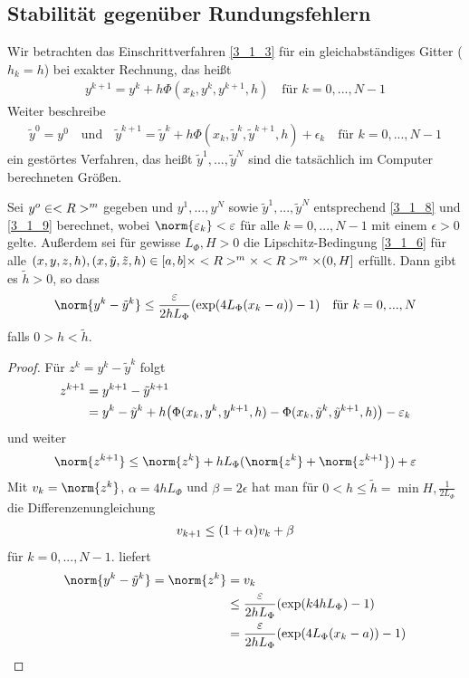 \subsection{Stabilität gegenüber Rundungsfehlern}

Wir betrachten das Einschrittverfahren \cref{3_1_3} für ein gleichabständiges Gitter ($h_k=h$) bei exakter Rechnung, das heißt
\begin{align}
	\label{3_1_8}
	y^{k+1} = y^k + h\Phi(x_k,y^k,y^{k+1},h)\quad\text{für } k=0,...,N-1
\end{align}
Weiter beschreibe
\begin{align}
	\label{3_1_9}
	\tilde{y}^0 = y^0\quad\text{und}\quad \tilde{y}^{k+1}=\tilde{y}^k + h\Phi(x_k,\tilde{y}^k,\tilde{y}^{k+1},h)+\epsilon_k \quad\text{für } k=0,...,N-1
\end{align}
ein gestörtes Verfahren, das heißt $\tilde{y}^1,...,\tilde{y}^N$ sind die tatsächlich im Computer berechneten Größen.

\begin{proposition}
	Sei $y^o\in\R^m$ gegeben und $y^1,...,y^N$ sowie $\tilde{y}^1,...,\tilde{y}^N$ entsprechend \cref{3_1_8} und \cref{3_1_9} berechnet, wobei $\norm{\epsilon_k}<\epsilon$ für alle $k=0,...,N-1$ mit einem $\epsilon>0$ gelte. Außerdem sei für gewisse $L_\Phi,H>0$ die Lipschitz-Bedingung \cref{3_1_6} für alle $(x,y,z,h),(x,\tilde{y},\tilde{z},h)\in [a,b]\times \R^m\times \R^m\times (0,H]$ erfüllt. Dann gibt es $\tilde{h}>0$, so dass
	\begin{align}
		\norm{y^k-\tilde{y}^k} \le \frac{\epsilon}{2hL_\Phi}(\exp(4L_\Phi(x_k-a)) - 1)\quad\text{für } k=0,...,N\notag
	\end{align}
	falls $0>h<\tilde{h}$.
\end{proposition}
\begin{proof}
	Für $z^k=y^k-\tilde{y}^k$ folgt
	\begin{align}
		z^{k+1} &= y^{k+1} - \tilde{y}^{k+1} \notag \\
		&= y^k - \tilde{y}^k + h\big(\Phi(x_k,y^k,y^{k+1},h) - \Phi(x_k,\tilde{y}^k,\tilde{y}^{k+1},h)\big) - \epsilon_k \notag
	\end{align}
	und weiter
	\begin{align}
		\norm{z^{k+1}} \le \norm{z^k} + hL_\Phi(\norm{z^k} + \norm{z^{k+1}}) + \epsilon \notag
	\end{align}
	Mit $v_k=\norm{z^k}$, $\alpha=4hL_\Phi$ und $\beta=2\epsilon$ hat man für $0<h\le\tilde{h}=\min{H,\frac{1}{2L_\Phi}}$ die Differenzenungleichung
	\begin{align}
		v_{k+1} \le (1+\alpha)v_k + \beta \notag
	\end{align}
	für $k=0,...,N-1$.  liefert
	\begin{align}
		\norm{y^k-\tilde{y}^k} = \norm{z^k} &= v_k\notag \\
		&\le \frac{\epsilon}{2hL_\Phi}(\exp(k4hL_\Phi) - 1) \notag \\
		&= \frac{\epsilon}{2hL_\Phi}(\exp(4L_\Phi(x_k-a)) - 1) \notag
	\end{align}
\end{proof}

